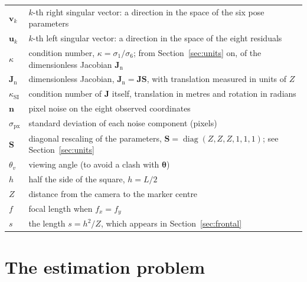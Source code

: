 \documentclass[11pt,a4paper]{article}
\theoremstyle{remark}
\newcommand{\Jmat}{\mathbf{J}}
\newcommand{\Smat}{\mathbf{S}}
\newcommand{\nvec}{\mathbf{n}}
\newcommand{\uvec}{\mathbf{u}}
\newcommand{\vvec}{\mathbf{v}}
\newcommand{\thetavec}{\boldsymbol{\theta}}
\begin{document}
\begin{longtable}{@{}lp{11.2cm}@{}}
$\vvec_k$ & $k$-th right singular vector: a direction in the space of the six
  pose parameters \\
$\uvec_k$ & $k$-th left singular vector: a direction in the space of the eight
  residuals \\
$\kappa$ & condition number, $\kappa = \sigma_1/\sigma_6$; from
  Section~\ref{sec:units} on, of the dimensionless Jacobian $\Jmat_{\mathrm{n}}$ \\
$\Jmat_{\mathrm{n}}$ & dimensionless Jacobian, $\Jmat_{\mathrm{n}} = \Jmat\Smat$,
  with translation measured in units of $Z$ \\
$\kappa_{\mathrm{SI}}$ & condition number of $\Jmat$ itself, translation in metres
  and rotation in radians \\
$\nvec$ & pixel noise on the eight observed coordinates \\
$\sigma_{\mathrm{px}}$ & standard deviation of each noise component (pixels) \\
$\Smat$ & diagonal rescaling of the parameters,
  $\Smat = \operatorname{diag}(Z,Z,Z,1,1,1)$; see Section~\ref{sec:units} \\
$\theta_v$ & viewing angle (to avoid a clash with $\thetavec$) \\
$h$ & half the side of the square, $h = L/2$ \\
$Z$ & distance from the camera to the marker centre \\
$f$ & focal length when $f_x = f_y$ \\
$s$ & the length $s = h^2/Z$, which appears in Section~\ref{sec:frontal} \\
\bottomrule
\end{longtable}

\section{The estimation problem}
\label{sec:problem}
\end{document}
